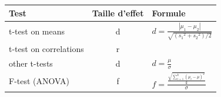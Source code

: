 \documentclass[
  12pt,
]{book}
\begin{document}
\begin{longtable}[]{@{}lcl@{}}
\toprule
\begin{minipage}[b]{0.11\columnwidth}\raggedright
Test\strut
\end{minipage} & \begin{minipage}[b]{0.35\columnwidth}\centering
Taille d'effet\strut
\end{minipage} & \begin{minipage}[b]{0.46\columnwidth}\raggedright
Formule\strut
\end{minipage}\tabularnewline
\midrule
\endhead
\begin{minipage}[t]{0.11\columnwidth}\raggedright
t-test on means\strut
\end{minipage} & \begin{minipage}[t]{0.35\columnwidth}\centering
d\strut
\end{minipage} & \begin{minipage}[t]{0.46\columnwidth}\raggedright
\(d = \frac{|\mu_1 - \mu_2|}{\sqrt{({s_1}^2 + {s_2}^2)/2}}\)\strut
\end{minipage}\tabularnewline
\begin{minipage}[t]{0.11\columnwidth}\raggedright
t-test on correlations\strut
\end{minipage} & \begin{minipage}[t]{0.35\columnwidth}\centering
r\strut
\end{minipage} & \begin{minipage}[t]{0.46\columnwidth}\raggedright
\strut
\end{minipage}\tabularnewline
\begin{minipage}[t]{0.11\columnwidth}\raggedright
other t-tests\strut
\end{minipage} & \begin{minipage}[t]{0.35\columnwidth}\centering
d\strut
\end{minipage} & \begin{minipage}[t]{0.46\columnwidth}\raggedright
\(d = \frac{\mu}{\sigma}\)\strut
\end{minipage}\tabularnewline
\begin{minipage}[t]{0.11\columnwidth}\raggedright
F-test (ANOVA)\strut
\end{minipage} & \begin{minipage}[t]{0.35\columnwidth}\centering
f\strut
\end{minipage} & \begin{minipage}[t]{0.46\columnwidth}\raggedright
\(f = \frac{\frac{\sqrt{\sum_{i=1}^k (\mu_i - \mu)^2}}{k}}{\sigma}\)\strut

\end{minipage}
\end{longtable}
\end{document}
